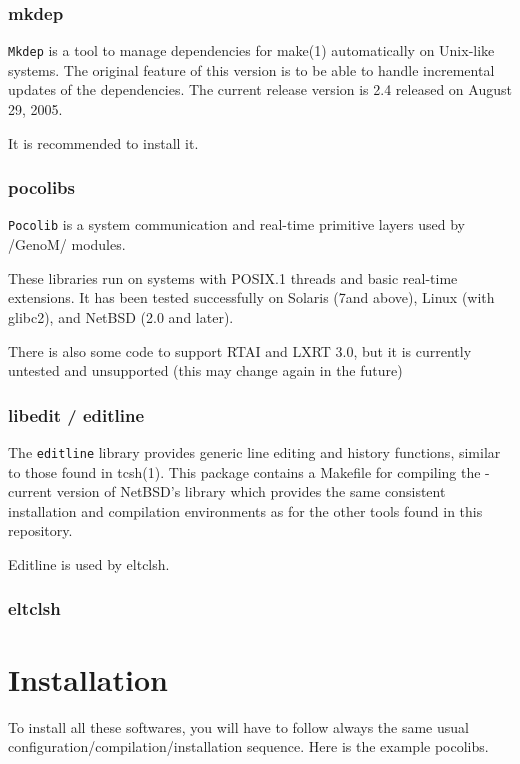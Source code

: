 \subsubsection{mkdep}

{\tt Mkdep} is a tool to manage dependencies for make(1) automatically on
Unix-like systems.  The original feature of this version is to be able to
handle incremental updates of the dependencies.  The current release
version is 2.4 released on August 29, 2005.

It is recommended to install it.

\subsubsection{pocolibs}

{\tt Pocolib} is a system communication and real-time primitive layers used by
/GenoM/ modules. 

These libraries run on systems with POSIX.1 threads and basic real-time
extensions. It has been tested successfully on Solaris (7and above),
Linux (with glibc2), and NetBSD (2.0 and later). 

There is also some code to support RTAI and LXRT 3.0, but it is currently
untested and unsupported (this may change again in the future) 

\subsubsection{libedit / editline}

The {\tt editline} library provides generic line editing and history
functions, similar to those found in tcsh(1). This package contains a
Makefile for compiling the -current version of NetBSD's library which
provides the same consistent installation and compilation environments as
for the other tools found in this repository. 

Editline is used by eltclsh.

\subsubsection{eltclsh}



\section{Installation}
\label{sec|configuration|installation}

To install all these softwares, you will have to follow always the same
usual configuration/compilation/installation sequence. Here is the
example pocolibs. 

